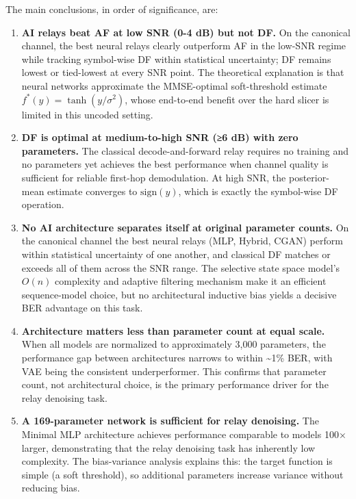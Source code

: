 The main conclusions, in order of significance, are:

\begin{enumerate}
\def\labelenumi{\arabic{enumi}.}
\item
  \textbf{AI relays beat AF at low SNR (0-4 dB) but not DF.} On the canonical channel, the best neural relays clearly outperform AF in the low-SNR regime while tracking symbol-wise DF within statistical uncertainty; DF remains lowest or tied-lowest at every SNR point. The theoretical explanation is that neural networks approximate the MMSE-optimal soft-threshold estimate \(f^*(y) = \tanh(y/\sigma^2)\), whose end-to-end benefit over the hard slicer is limited in this uncoded setting.
\item
  \textbf{DF is optimal at medium-to-high SNR (≥6 dB) with zero parameters.} The classical decode-and-forward relay requires no training and no parameters yet achieves the best performance when channel quality is sufficient for reliable first-hop demodulation. At high SNR, the posterior-mean estimate converges to \(\text{sign}(y)\), which is exactly the symbol-wise DF operation.
\item
  \textbf{No AI architecture separates itself at original parameter counts.} On the canonical channel the best neural relays (MLP, Hybrid, CGAN) perform within statistical uncertainty of one another, and classical DF matches or exceeds all of them across the SNR range. The selective state space model's \(O(n)\) complexity and adaptive filtering mechanism make it an efficient sequence-model choice, but no architectural inductive bias yields a decisive BER advantage on this task.
\item
  \textbf{Architecture matters less than parameter count at equal scale.} When all models are normalized to approximately 3,000 parameters, the performance gap between architectures narrows to within \textasciitilde1\% BER, with VAE being the consistent underperformer. This confirms that parameter count, not architectural choice, is the primary performance driver for the relay denoising task.
\item
  \textbf{A 169-parameter network is sufficient for relay denoising.} The Minimal MLP architecture achieves performance comparable to models 100× larger, demonstrating that the relay denoising task has inherently low complexity. The bias-variance analysis explains this: the target function is simple (a soft threshold), so additional parameters increase variance without reducing bias.

\end{enumerate}
